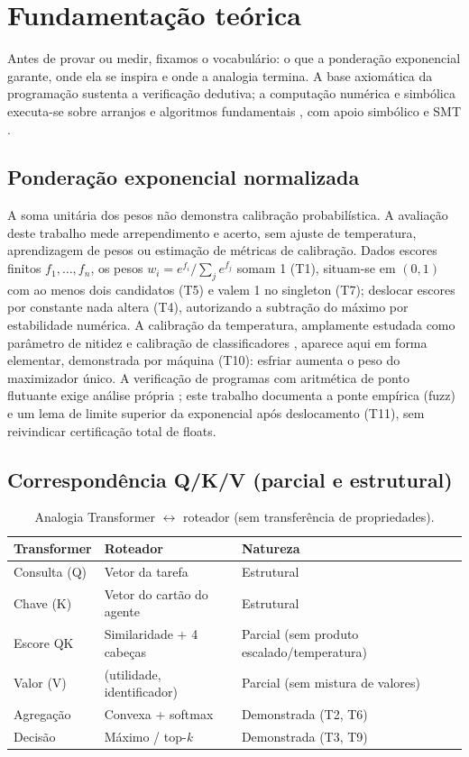 \chapter{Fundamentação teórica}\label{cap:fundamentacao}
Antes de provar ou medir, fixamos o vocabulário: o que a ponderação exponencial garante, onde ela se inspira e onde a analogia termina. A base axiomática da programação \cite{hoare1969} sustenta a verificação dedutiva; a computação numérica e simbólica executa-se sobre arranjos e algoritmos fundamentais \cite{harris2020,virtanen2020}, com apoio simbólico e SMT \cite{meurer2017,demoura2008}.
\section{Ponderação exponencial normalizada}
A soma unitária dos pesos não demonstra calibração probabilística. A avaliação deste trabalho mede arrependimento e acerto, sem ajuste de temperatura, aprendizagem de pesos ou estimação de métricas de calibração.
Dados escores finitos $f_1,\dots,f_n$, os pesos $w_i=e^{f_i}/\sum_j e^{f_j}$ somam 1 (T1), situam-se em $(0,1)$ com ao menos dois candidatos (T5) e valem 1 no singleton (T7); deslocar escores por constante nada altera (T4), autorizando a subtração do máximo por estabilidade numérica. A calibração da temperatura, amplamente estudada como parâmetro de nitidez e calibração de classificadores \cite{komisarenko2024,xuan2025,xie2024}, aparece aqui em forma elementar, demonstrada por máquina (T10): esfriar aumenta o peso do maximizador único. A verificação de programas com aritmética de ponto flutuante exige análise própria \cite{bagnara2019,murray2026}; este trabalho documenta a ponte empírica (fuzz) e um lema de limite superior da exponencial após deslocamento (T11), sem reivindicar certificação total de floats.
\section{Correspondência Q/K/V (parcial e estrutural)}
\begin{table}[htbp]
\fontsize{10}{12}\selectfont\SingleSpacing
\centering
\caption{Analogia Transformer $\leftrightarrow$ roteador (sem transferência de propriedades).}
\label{tab:qkv}
\begin{tabularx}{\textwidth}{lXX}
\toprule
Transformer & Roteador & Natureza \\
\midrule
Consulta (Q) & Vetor da tarefa & Estrutural \\
Chave (K) & Vetor do cartão do agente & Estrutural \\
Escore QK & Similaridade + 4 cabeças & Parcial (sem produto escalado/temperatura) \\
Valor (V) & (utilidade, identificador) & Parcial (sem mistura de valores) \\
Agregação & Convexa + softmax & Demonstrada (T2, T6) \\
Decisão & Máximo / top-\textit{k} & Demonstrada (T3, T9) \\
\bottomrule
\end{tabularx}
\end{table}
